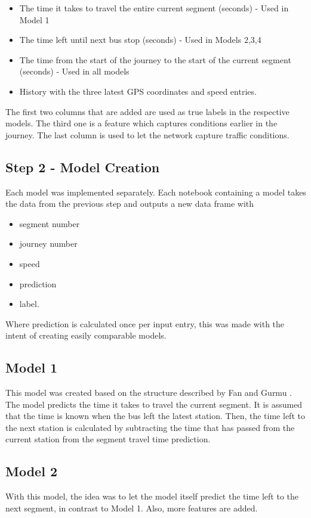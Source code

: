 \begin{itemize}
    \item The time it takes to travel the entire current segment (seconds) - Used in Model 1
    \item The time left until next bus stop (seconds) - Used in Models 2,3,4
    \item The time from the start of the journey to the start of the current segment (seconds) - Used in all models
    \item History with the three latest GPS coordinates and speed entries.
\end{itemize}

\noindent The first two columns that are added are used as true labels in the respective models. The third one is a feature which captures conditions earlier in the journey. The last column is used to let the network capture traffic conditions.

\subsection{Step 2 - Model Creation}
Each model was implemented separately. Each notebook containing a model takes the data from the previous step and outputs a new data frame with 

\begin{itemize}
    \item segment number
    \item journey number
    \item speed
    \item prediction
    \item label.
\end{itemize}

Where prediction is calculated once per input entry, this was made with the intent of creating easily comparable models.


\subsection{Model 1}
This model was created based on the structure described by Fan and Gurmu \cite{brazilANN}. The model predicts the time it takes to travel the current segment. It is assumed that the time is known when the bus left the latest station. Then, the time left to the next station is calculated by subtracting the time that has passed from the current station from the segment travel time prediction.

\subsection{Model 2}\label{M2}
With this model, the idea was to let the model itself predict the time left to the next segment, in contrast to Model 1. Also, more features are added.

